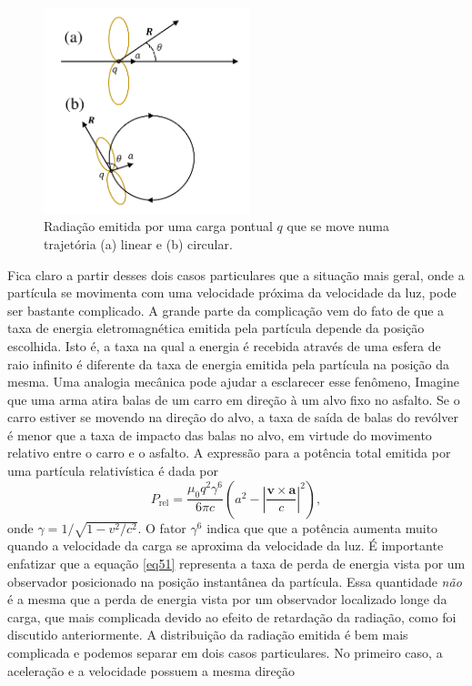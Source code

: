 \documentclass{article}
\begin{document}
\begin{figure}[ht]
\centering
\includegraphics[width=6cm]{fig3.pdf}
\caption{Radiação emitida por uma carga pontual $q$ que se move numa trajetória (a) linear e (b) circular. }
\end{figure}

Fica claro a partir desses dois casos particulares que a situação mais geral, onde a partícula se movimenta com uma velocidade próxima da velocidade da luz, pode ser bastante complicado. A grande parte da complicação vem do fato de que a taxa de energia eletromagnética emitida pela partícula depende da posição escolhida. Isto é, a taxa na qual a energia é recebida através de uma esfera de raio infinito é diferente da taxa de energia emitida pela partícula na posição da mesma. Uma analogia mecânica pode ajudar a esclarecer esse fenômeno, Imagine que uma arma atira balas de um carro em direção à um alvo fixo no asfalto. Se o carro estiver se movendo na direção do alvo, a taxa de saída de balas do revólver é menor que a taxa de impacto das balas no alvo, em virtude do movimento relativo entre o carro e o asfalto. A expressão para a potência total emitida por uma partícula relativística é dada por
\begin{equation}
    P_{\text{rel}} = \frac{\mu_0 q^2 \gamma^6}{6 \pi c}\left( a^2 - \left| \frac{\mathbf{v}\times\mathbf{a}}{c} \right|^2 \right),
    \label{eq51}
\end{equation}
onde $\gamma = 1/\sqrt{1-v^2 / c^2}$. O fator $\gamma^6$ indica que que a potência aumenta muito quando a velocidade da carga se aproxima da velocidade da luz. É importante enfatizar que a equação \eqref{eq51} representa a taxa de perda de energia vista por um observador posicionado na posição instantânea da partícula. Essa quantidade \textit{não} é a mesma que a perda de energia vista por um observador localizado longe da carga, que mais complicada devido ao efeito de retardação da radiação, como foi discutido anteriormente. A distribuição da radiação emitida é bem mais complicada e podemos separar em dois casos particulares. No primeiro caso, a aceleração e a velocidade possuem a mesma direção
\end{document}
